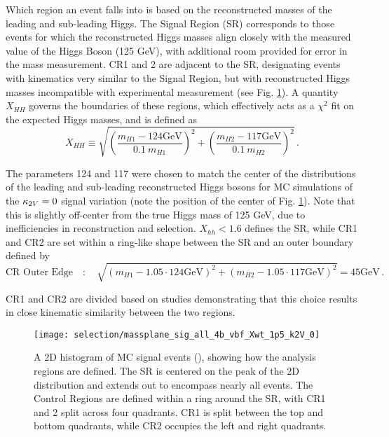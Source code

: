         Which region an event falls into is based on the reconstructed masses of the leading and sub-leading Higgs.
        The Signal Region (SR) corresponds to those events for which the reconstructed Higgs masses
            align closely with the measured value of the Higgs Boson (125 GeV),
            with additional room provided for error in the mass measurement.
        CR1 and 2 are adjacent to the SR, designating events with kinematics very similar to the Signal Region,
            but with reconstructed Higgs masses incompatible with experimental measurement (see Fig. \ref{fig:region_definition}).
        A quantity $X_{HH}$ governs the boundaries of these regions,
            which effectively acts as a $\chi^2$ fit on the expected Higgs masses,
            and is defined as
        \begin{equation} \label{eq:xhh}
            X_{HH} \equiv \sqrt{\left(\frac{m_{H1} - 124\textrm{GeV}}{0.1 \ m_{H1}}\right)^{2}
                + \left(\frac{m_{H2} - 117\textrm{GeV}}{0.1 \ m_{H2}}\right)^{2}}
            \,.
        \end{equation}

        The \mhh parameters 124 and 117 were chosen to match the center of the \mhh distributions
            of the leading and sub-leading reconstructed Higgs bosons for
            MC simulations of the $\kappa_{2V} = 0$ signal variation
            (note the position of the center of Fig. \ref{fig:region_definition}).
        Note that this is slightly off-center from the true Higgs mass of 125 GeV,
            due to inefficiencies in reconstruction and selection.
        $X_{hh} < 1.6$ defines the SR,
            while CR1 and CR2 are set within a ring-like shape between the SR
            and an outer boundary defined by
        \begin{equation} \label{eq:cr_out}
            \text{CR\ Outer\ Edge} \quad : \quad \sqrt{ \left(m_{H1} - 1.05 \cdot 124\textrm{GeV}\right)^2
                +  \left(m_{H2} - 1.05 \cdot 117\textrm{GeV}\right)^2 } = 45\textrm{GeV}
            \,.
        \end{equation}
        
        CR1 and CR2 are divided based on studies demonstrating that this choice results in
            close kinematic similarity between the two regions.

        \begin{figure}[tbh]
            \texttt{[image: selection/massplane\_sig\_all\_4b\_vbf\_Xwt\_1p5\_k2V\_0]}
            \caption{
                A 2D histogram of MC signal events (), showing how the analysis regions are defined.
                The SR is centered on the peak of the 2D distribution and extends out to encompass nearly all events.
                The Control Regions are defined within a ring around the SR,
                    with CR1 and 2 split across four quadrants.
                CR1 is split between the top and bottom quadrants,
                    while CR2 occupies the left and right quadrants.
                \cite{hh4b_2021_int_note}
            }
            \label{fig:region_definition}
        \end{figure}

